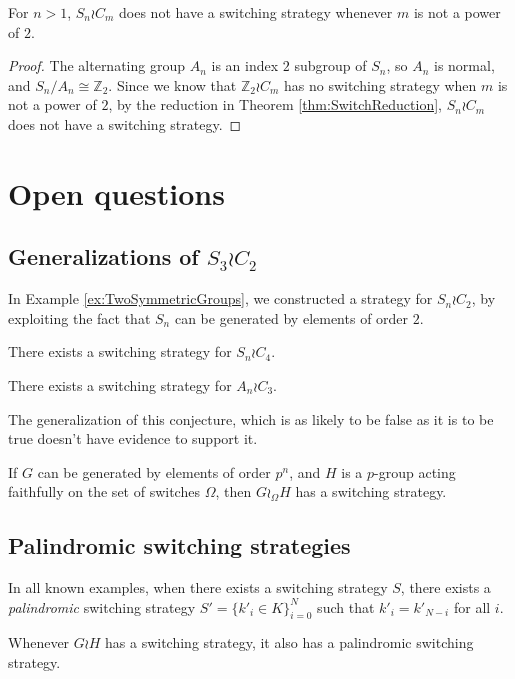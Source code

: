 \begin{proposition}
  For $n > 1$, $S_n \wr C_m$ does not have a switching strategy whenever
  $m$ is not a power of $2$.
\end{proposition}
\begin{proof}
  The alternating group $A_n$ is an index $2$ subgroup of $S_n$, so $A_n$ is
  normal, and $S_n/A_n \cong \mathbb Z_2$.
  Since we know that $\mathbb Z_2 \wr C_m$ has no switching strategy when
  $m$ is not a power of $2$,
  by the reduction in Theorem \ref{thm:SwitchReduction}, $S_n \wr C_m$ does
  not have a switching strategy.
\end{proof}
%
%
\section{Open questions}
\label{sec:OpenQuestions}
\subsection{Generalizations of \texorpdfstring{$S_3 \wr C_2$}{Two interchangeable copies of the symmetric group}}

In Example \ref{ex:TwoSymmetricGroups}, we constructed a strategy for $S_n \wr C_2$,
by exploiting the fact that $S_n$ can be generated by elements of order $2$.

\begin{conjecture}
  There exists a switching strategy for $S_n \wr C_4$.
\end{conjecture}

\begin{conjecture}
  There exists a switching strategy for $A_n \wr C_3$.
\end{conjecture}

The generalization of this conjecture, which is as likely to be false as it is
to be true doesn't have evidence to support it.
\begin{conjecture}
  If $G$ can be generated by elements of order $p^n$, and $H$ is a $p$-group
  acting faithfully on the set of switches $\Omega$, then $G \wr_\Omega H$ has
  a switching strategy.
\end{conjecture}

\subsection{Palindromic switching strategies}
In all known examples, when there exists a switching strategy $S$,
there exists a \textit{palindromic} switching strategy
$S' = \{k'_i \in K\}_{i=0}^N$
such that $k'_i = k'_{N-i}$ for all $i$.
\begin{conjecture}
  Whenever $G \wr H$ has a switching strategy, it also has a palindromic switching
  strategy.
\end{conjecture}

